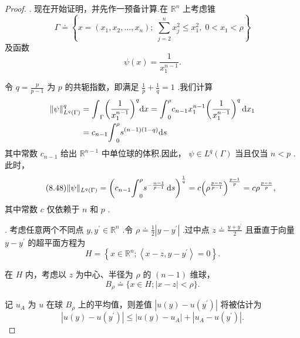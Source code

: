 \begin{proof}
. 现在开始证明，并先作一预备计算.在 ${\mathbb{R}}^{n}$ 上考虑锥
\[
\Gamma  \doteq  \left\{  {x = \left( {{x}_{1},{x}_{2},\ldots ,{x}_{n}}\right) ;\;\sum_{{j = 2}}^{n}{x}_{j}^{2} \leq  {x}_{1}^{2},\;0 < {x}_{1} < \rho }\right\}
\]
及函数
\begin{equation}\tag{8.47}\label{eq:morrey-psi}
\psi \left( x\right)  = \frac{1}{{x}_{1}^{n - 1}}.
\end{equation}

令 $q = \frac{p}{p - 1}$ 为 $p$ 的共轭指数，即满足 $\frac{1}{p} + \frac{1}{q} = 1$ .我们计算
{\setjot[0]\begin{align*}
    \| \psi {\| }_{{L}^{q}\left( \Gamma \right) }^{q} &= {\int }_{\Gamma }{\left( \frac{1}{{x}_{1}^{n - 1}}\right) }^{q}{\mathop{}\!\mathrm{d} x} = {\int }_{0}^{\rho }{c}_{n - 1}{x}_{1}^{n - 1}{\left( \frac{1}{{x}_{1}^{n - 1}}\right) }^{q}\mathop{}\!\mathrm{d} x_{1}\\
    &= {c}_{n - 1}{\int }_{0}^{\rho }{s}^{\left( {n - 1}\right) \left( {1 - q}\right) }{\mathop{}\!\mathrm{d} s}
\end{align*}}
其中常数 ${c}_{n - 1}$ 给出 ${\mathbb{R}}^{n - 1}$ 中单位球的体积.因此， $\psi  \in  {L}^{q}\left( \Gamma \right)$ 当且仅当 $n < p$ .此时，
\begin{equation}\tag{8.48}\label{eq:morrey-psi-norm}
\| \psi {\| }_{{L}^{q}\left( \Gamma \right) } = {\left( {c}_{n - 1}{\int }_{0}^{\rho }{s}^{-\frac{n - 1}{p - 1}}\mathop{}\!\mathrm{d} s\right) }^{\frac{1}{q}} = c{\left( {\rho }^{\frac{p - n}{p - 1}}\right) }^{\frac{p - 1}{p}} = c{\rho }^{\frac{p - n}{p}},
\end{equation}
其中常数 $c$ 仅依赖于 $n$ 和 $p$ .

. 考虑任意两个不同点 $y,{y}^{\prime } \in  {\mathbb{R}}^{n}$ .令 $\rho  \doteq  \frac{1}{2}\left| {y - {y}^{\prime }}\right|$ .过中点 $z \doteq  \frac{y + {y}^{\prime }}{2}$ 且垂直于向量 $y - {y}^{\prime }$ 的超平面方程为
\[
H = \left\{  {x \in  {\mathbb{R}}^{n};\left\langle  {x - z,y - {y}^{\prime }}\right\rangle   = 0}\right\}  .
\]

在 $H$ 内，考虑以 $z$ 为中心、半径为 $\rho$ 的 $\left( {n - 1}\right)$ 维球，
\[
{B}_{\rho } \doteq  \{ x \in  H;\left| {x - z}\right|  < \rho \} .
\]

记 ${u}_{A}$ 为 $u$ 在球 ${B}_{\rho }$ 上的平均值，则差值 $\left| {u\left( y\right)  - u\left( {y}^{\prime }\right) }\right|$ 将被估计为
\begin{equation}\tag{8.49}\label{eq:morrey-split}
\left| {u\left( y\right)  - u\left( {y}^{\prime }\right) }\right|  \leq  \left| {u\left( y\right)  - {u}_{A}}\right|  + \left| {{u}_{A} - u\left( {y}^{\prime }\right) }\right| .
\end{equation}


\end{proof}

